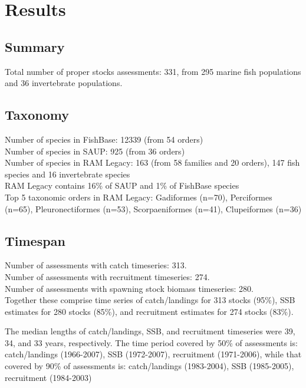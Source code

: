\section*{Results}
\subsection*{Summary}
\noindent
Total number of proper stocks assessments: 331, from 295 marine fish populations and 36
invertebrate populations.

\subsection*{Taxonomy}
\noindent

Number of species in FishBase: 12339 (from 54 orders) \\
Number of species in SAUP: 925 (from 36 orders)\\
Number of species in RAM Legacy: 163 (from 58 families and 20 orders), 147 fish species and 16 invertebrate species \\
RAM Legacy contains 16\% of SAUP and 1\% of FishBase species\\
Top 5 taxonomic orders in RAM Legacy: Gadiformes (n=70), Perciformes (n=65), Pleuronectiformes (n=53), Scorpaeniformes (n=41), Clupeiformes (n=36) \\

\subsection*{Timespan}
\noindent
Number of assessments with catch timeseries: 313.\\
Number of assessments with recruitment timeseries: 274.\\
Number of assessments with spawning stock biomass timeseries: 280.\\

Together these comprise time series of
catch/landings for 313 stocks (95\%),
SSB estimates for 280 stocks (85\%), and recruitment estimates for
274 stocks (83\%).

The median lengths of catch/landings, SSB, and recruitment timeseries
were 39, 34, and 33
years, respectively.  The time period covered by 50\% of assessments
is: catch/landings (1966-2007), SSB
(1972-2007), recruitment (1971-2006), while that
covered by 90\% of assessments is: catch/landings
(1983-2004), SSB (1985-2005), recruitment
(1984-2003)
 
